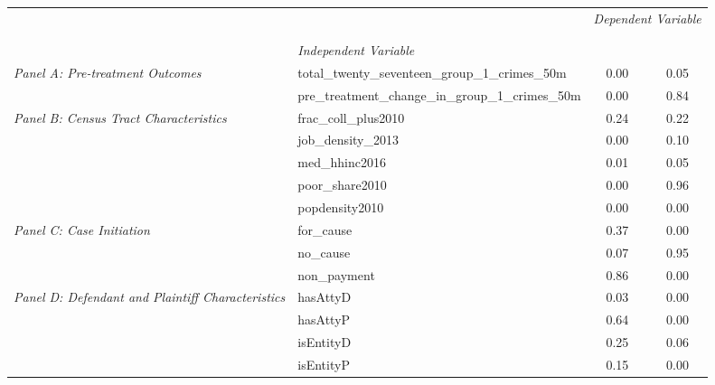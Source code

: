 \begin{tabular}{llcc}
\toprule
 &  & \multicolumn{2}{c}{\textit{Dependent Variable}} \\
\cline{3-4}
\\
 &  &  &  \\
 & \emph{Independent Variable} &  &  \\
\midrule
\multirow[c]{2}{3cm}{\textit{Panel A: Pre-treatment Outcomes}} & total_twenty_seventeen_group_1_crimes_50m & 0.00 & 0.05 \\
 & pre_treatment_change_in_group_1_crimes_50m & 0.00 & 0.84 \\
\cline{1-4}
\multirow[c]{5}{3cm}{\textit{Panel B: Census Tract Characteristics}} & frac_coll_plus2010 & 0.24 & 0.22 \\
 & job_density_2013 & 0.00 & 0.10 \\
 & med_hhinc2016 & 0.01 & 0.05 \\
 & poor_share2010 & 0.00 & 0.96 \\
 & popdensity2010 & 0.00 & 0.00 \\
\cline{1-4}
\multirow[c]{3}{3cm}{\textit{Panel C: Case Initiation}} & for_cause & 0.37 & 0.00 \\
 & no_cause & 0.07 & 0.95 \\
 & non_payment & 0.86 & 0.00 \\
\cline{1-4}
\multirow[c]{4}{3cm}{\textit{Panel D: Defendant and Plaintiff Characteristics}} & hasAttyD & 0.03 & 0.00 \\
 & hasAttyP & 0.64 & 0.00 \\
 & isEntityD & 0.25 & 0.06 \\
 & isEntityP & 0.15 & 0.00 \\
\cline{1-4}
\bottomrule
\end{tabular}
